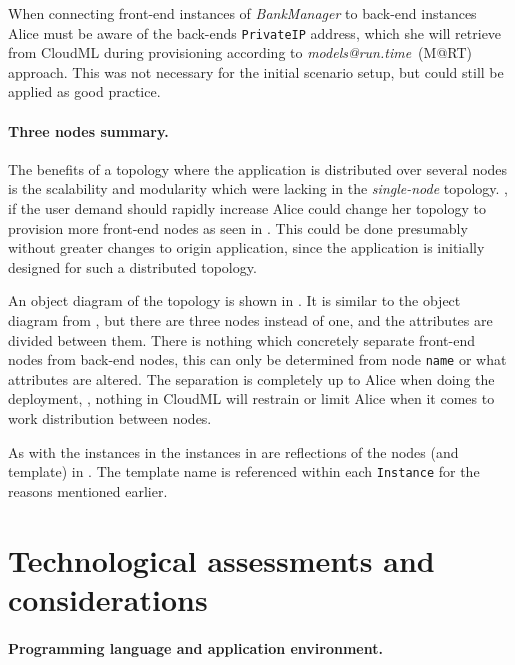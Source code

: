 When connecting front-end instances of \emph{BankManager} to back-end instances Alice must 
be aware of the back-ends \texttt{PrivateIP} address, which she will retrieve from CloudML
during provisioning according to \emph{models@run.time}~(M@RT) approach.
This was not necessary for the initial scenario setup, but could still be applied
as good practice.

\paragraph{Three nodes summary.}


The benefits of a topology where the application is distributed over several nodes 
is the scalability and modularity which were lacking in the \emph{single-node} topology.
\eg, if the user demand should rapidly increase Alice could change her topology to
provision more front-end nodes as seen in .
This could be done presumably without greater changes to origin application,
since the application is initially designed for such a distributed topology.

An object diagram of the topology is shown in .
It is similar to the object diagram from ,
but there are three nodes instead of one, and the attributes are divided between them.
There is nothing which concretely separate front-end nodes from back-end nodes,
this can only be determined from node \texttt{name} or what attributes are altered.
The separation is completely up to Alice when doing the deployment,
\ie, nothing in CloudML will restrain or limit Alice 
when it comes to work distribution between nodes.

As with the instances in  the instances in 
are reflections of the nodes (and template) in .
The template name is referenced within each \texttt{Instance} 
for the reasons mentioned earlier.

\section{Technological assessments and considerations}



\paragraph{Programming language and application environment.}


